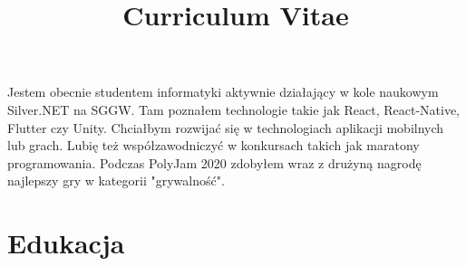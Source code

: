 \documentclass[11pt,a4paper,sans]{moderncv}        %
\title{Curriculum Vitae}                               %
\begin{document}
\makecvtitle

\section{}
Jestem obecnie studentem informatyki aktywnie działający w kole naukowym Silver.NET na SGGW. Tam
poznałem technologie takie jak React, React-Native, Flutter czy Unity. Chciałbym rozwijać się w technologiach
aplikacji mobilnych lub grach. Lubię też współzawodniczyć w konkursach takich jak maratony
programowania. Podczas PolyJam 2020 zdobyłem wraz z drużyną nagrodę najlepszy gry w kategorii
"grywalność".

\section{Edukacja}

\end{document}
